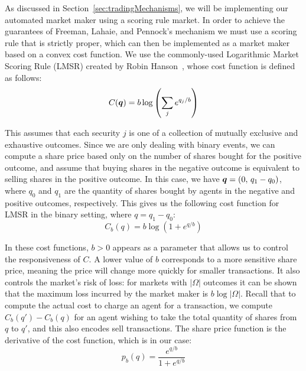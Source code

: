 As discussed in Section~\ref{sec:tradingMechanisms}, we will be implementing
our automated market maker using a scoring rule market. In order to achieve the
guarantees of Freeman, Lahaie, and Pennock's mechanism we must use a scoring
rule that is strictly proper, which can then be implemented as a market maker
based on a convex cost function. We use the commonly-used Logarithmic Market
Scoring Rule (LMSR) created by Robin Hanson~\cite{Hanson2007}, whose cost
function is defined as follows:
%
\begin{equation}
	\label{eq:LMSR}
	C(\bm{q}) = b \log \left( \sum_j e^{q_j/b} \right)
\end{equation}

This assumes that each security $j$ is one of a collection of mutually
exclusive and exhaustive outcomes. Since we are only dealing with binary
events, we can compute a share price based only on the number of shares bought
for the positive outcome, and assume that buying shares in the negative outcome
is equivalent to selling shares in the positive outcome. In this case, we have
$\bm{q}=( 0 , \, q_1 - q_0 )$, where $q_0$ and $q_1$ are the quantity of
shares bought by agents in the negative and positive outcomes, respectively.
This gives us the following cost function for LMSR in the binary setting, where
$q=q_1-q_0$:
%
\begin{equation}
	\label{eq:LMSRbinary}
	C_b (q) = b \log (1 + e^{q/b})
\end{equation}

In these cost functions, $b>0$ appears as a parameter that allows us to control
the responsiveness of $C$. A lower value of $b$ corresponds to a more sensitive
share price, meaning the price will change more quickly for smaller
transactions. It also controls the market's risk of loss: for markets with
$|\Omega|$ outcomes it can be shown that the maximum loss incurred by the
market maker is $b \log |\Omega|$. Recall that to compute the actual cost to
charge an agent for a transaction, we compute $C_b(q')-C_b(q)$ for an agent
wishing to take the total quantity of shares from $q$ to $q'$, and this also
encodes sell transactions. The share price function is the derivative of the
cost function, which is in our case:
%
\begin{equation}
	\label{eq:LMSRprice}
	p_b(q) = \frac{e^{q/b}}{1+e^{q/b}}
\end{equation}

